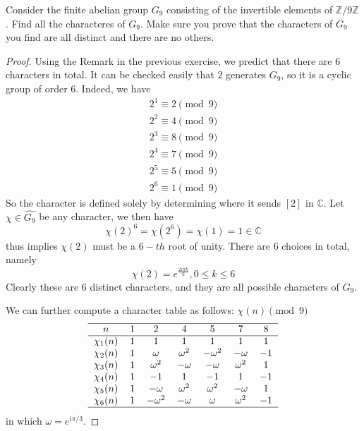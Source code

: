 \documentclass[11pt,letterpaper]{article}
\DeclareMathOperator{\1}{\mathbbm{1}}
\begin{document}
\begin{exercise}
  \label{ex3}
  Consider the finite abelian group $G_9$ consisting of the invertible elements of $\mathbb{Z}/9\mathbb{Z}$. Find all the characteres of $G_9$.
  Make sure you prove that the characters of $G_9$ you find are all distinct and there are no others.
\end{exercise}
\begin{proof}
  Using the Remark in the previous exercise, we predict that there are $6$ characters in total. It can be checked easily that $2$ generates $G_9$, so it is a
  cyclic group of order $6$. Indeed, we have
  \begin{align*}
    2^1 \equiv 2 \pmod 9 \\
    2^2 \equiv 4 \pmod 9 \\
    2^3 \equiv 8 \pmod 9 \\
    2^4 \equiv 7 \pmod 9 \\
    2^5 \equiv 5 \pmod 9 \\
    2^6 \equiv 1 \pmod 9
  \end{align*}
  So the character is defined solely by determining where it sends $[2]$ in $\mathbb{C}$. Let $\chi \in \hat{G_9}$ be
  any character, we then have
  \[\chi(2)^6=\chi(2^6) = \chi(1) = 1 \in \mathbb{C}\]
  thus implies $\chi(2)$ must be a $6-th$ root of unity. There are $6$ choices in total, namely
  \[\chi(2) = e^{\frac{2i\pi k}{6}}, 0 \le k \le 6\]
  Clearly these are 6 distinct characters, and they are all possible characters of $G_9$.

  We can further compute a character table as follows:
  $\chi(n)\pmod{9}$ \\
  \[\begin{tabular}{c c c c c c c }
      \hline
      $n$         & $1$ & $2$           & $4$          & $5$           & $7$          & $8$  \\
      \hline
      $\chi_1(n)$ & $1$ & $1$           & $1$          & $1$           & $1$          & $1$  \\
      $\chi_2(n)$ & $1$ & $\omega$      & $\omega^{2}$ & $-\omega^{2}$ & $-\omega$    & $-1$ \\
      $\chi_3(n)$ & $1$ & $\omega^{2}$  & $-\omega$    & $-\omega$     & $\omega^{2}$ & $1$  \\
      $\chi_4(n)$ & $1$ & $-1$          & $1$          & $-1$          & $1$          & $-1$ \\
      $\chi_5(n)$ & $1$ & $-\omega$     & $\omega^{2}$ & $\omega^{2}$  & $-\omega$    & $1$  \\
      $\chi_6(n)$ & $1$ & $-\omega^{2}$ & $-\omega$    & $\omega$      & $\omega^{2}$ & $-1$ \\
      \hline
    \end{tabular}\]
  in which $\omega = e^{i\pi/3}$.
\end{proof}
\end{document}
